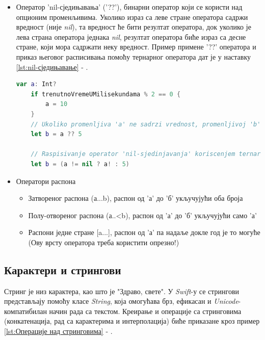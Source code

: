 \documentclass[12pt,oneside]{memoir}
\begin{document}
\begin{itemize}
    \item Оператор 'nil-сједињавања' ('??'), бинарни оператор који се користи над опционим променљивима. Уколико израз са леве стране оператора садржи вредност (није \textit{nil}), та вредност ће бити резултат оператора, док уколико је лева страна оператора једнака  \textit{nil}, резултат оператора биће израз са десне стране, који мора садржати неку вредност. Пример примене '??' оператора и приказ његовог расписивања помоћу тернарног оператора дат је у наставку \ref{lst:nil-сједињавање} - .
    
    \begin{lstlisting}[caption=\textit{{nil-сједињавање}}, label={lst:nil-сједињавање}, language=Swift, frame=single]
    var a: Int?
    if trenutnoVremeUMilisekundama % 2 == 0 {
        a = 10
    }
    // Ukoliko promenljiva 'a' ne sadrzi vrednost, promenljivoj 'b' bice dodeljena vrednost 5
    let b = a ?? 5
    
    // Raspisivanje operator 'nil-sjedinjavanja' koriscenjem ternarnog operatora:
    let b = (a != nil ? a! : 5)
    \end{lstlisting}
    
    \item Оператори распона
    
\begin{itemize}
    \item Затвореног распона (а...b), распон од 'а' до 'б' укључујући оба броја
    \item Полу-отвореног распона (а..<b), распон од 'а' до 'б' укључујући само 'а'
    \item Распони једне стране [a...], распон од 'а' па надаље докле год је то могуће (Ову врсту оператора треба користити опрезно!)
\end{itemize}

\end{itemize}

\subsection{Карактери и стрингови}

\indent Стринг је низ карактера, као што је "Здраво, свете". У \textit{Swift}-у се стрингови представљају помоћу класе \textit{String}, која омогућава брз, ефикасан и \textit{Unicode}-компатибилан начин рада са текстом. Креирање и операције са стринговима (конкатенација, рад са карактерима и интерполација) биће приказане кроз пример \ref{lst:Операције над стринговима} - .
\end{document}
